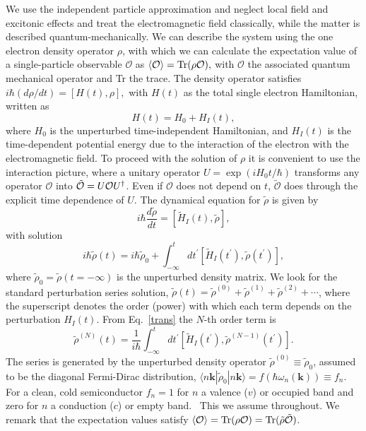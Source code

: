 \documentclass[floatfix,prb,aps,superscriptaddress,11pt,preprint,letterpaper]{revtex4}
\begin{document}
We use the independent particle approximation and neglect local field
and excitonic effects and
treat the electromagnetic field classically, while the matter is
described quantum-mechanically.
We can describe the system using 
the one electron density
operator ${\rho}$, with which we can calculate the expectation value of a
single-particle observable $\mathcal{O}$ as 
$\langle{\cal O}\rangle=\mbox{Tr}({\rho} {\cal O}),  
\label{calo}$
with $\mathcal{O}$ the associated quantum mechanical operator and Tr
the trace. 
The density operator satisfies
$
i\hbar (d{\rho}/dt)=[H(t),{\rho}],  
\label{rho}
$
with $H(t)$ as the total single electron Hamiltonian, written as 
\begin{equation*}
H(t)=H_{0}+H_{I}(t),  
\label{ache}
\end{equation*}
where $H_{0}$ is the unperturbed time-independent Hamiltonian, and $H_{I}(t)$
is the time-dependent potential energy due to the interaction of the
electron with the electromagnetic field.
To proceed with the solution of $\rho$  it is convenient to use the
interaction picture, where a unitary operator $U=\exp ({iH_{0}t/\hbar })$
transforms any operator $\mathcal{O}$ into 
$\tilde{\mathcal{O}}=U{\cal O}U^{\dagger }$. Even if $\mathcal{O}$ does not depend on $t$, $\tilde{
\mathcal{O}}$ does through the explicit time dependence of $U$. 
The dynamical 
equation for $\tilde{\rho}$ is 
given by
\begin{equation*}
i\hbar \frac{d\tilde{{\rho}}}{dt}=[\tilde{H}_{I}(t),\tilde{{\rho}}],  
\label{rho1}
\end{equation*}
with solution 
\begin{equation}
i\hbar \tilde{{\rho}}(t)=i\hbar \tilde{{\rho}}_{0}+\int_{-\infty }^{t}dt^{\prime }[
\tilde{H}_{I}(t^{\prime }),\tilde{\rho}(t^{\prime })],  
\label{trans}
\end{equation}
where $\tilde{\rho}_{0}=\tilde{\rho}(t=-\infty )$ is the unperturbed density matrix. We look
for the standard perturbation series solution, 
$\tilde{\rho}(t)=\tilde{\rho}^{(0)}+\tilde{\rho}^{(1)}+\tilde{\rho}^{(2)}+\cdots$,  
where the superscript denotes the order (power) with which each term depends
on the perturbation $H_{I}(t)$. From Eq.~\eqref{trans} the $N$-th order
term is 
\begin{equation}
\tilde{{\rho}}^{(N)}(t)=\frac{1}{i\hbar }\int_{-\infty }^{t}dt^{\prime }[\tilde{
H}_{I}(t^{\prime }),\tilde{\rho}^{(N-1)}(t^{\prime })].  
\label{rhop}
\end{equation}
The series is generated by the unperturbed density operator $\tilde{\rho}
^{(0)}\equiv \tilde{\rho}_{0}$, assumed to be the diagonal Fermi-Dirac distribution, 
$\langle n\mathbf{k}|\tilde{\rho}_{0}|n\mathbf{k}\rangle=f(\hbar \omega_{n}(\mathbf{k}))\equiv f_{n}$. For a
clean, cold semiconductor $f_{n}=1$ for $n$ a valence ($v$) or
occupied band and zero for $n$ a conduction ($c$) or empty band. \ This we
assume throughout.
We remark that the expectation values satisfy
$
\langle{\cal O}\rangle=
\mbox{Tr}({\rho}{\cal O})
=
\mbox{Tr}(\tilde{{\rho}}\tilde{\cal O})
$.  
\end{document}
